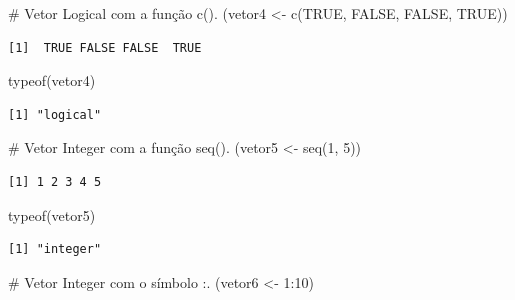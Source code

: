 \documentclass[
  letterpaper,
  DIV=11,
  numbers=noendperiod]{scrreprt}
\newenvironment{Shaded}{\begin{snugshade}}{\end{snugshade}}
\newcommand{\CommentTok}[1]{\textcolor[rgb]{0.37,0.37,0.37}{#1}}
\newcommand{\ConstantTok}[1]{\textcolor[rgb]{0.56,0.35,0.01}{#1}}
\newcommand{\DecValTok}[1]{\textcolor[rgb]{0.68,0.00,0.00}{#1}}
\newcommand{\FunctionTok}[1]{\textcolor[rgb]{0.28,0.35,0.67}{#1}}
\newcommand{\NormalTok}[1]{\textcolor[rgb]{0.00,0.23,0.31}{#1}}
\newcommand{\OtherTok}[1]{\textcolor[rgb]{0.00,0.23,0.31}{#1}}
\newcommand{\SpecialCharTok}[1]{\textcolor[rgb]{0.37,0.37,0.37}{#1}}
\begin{document}
\begin{Shaded}
\begin{Highlighting}[]
\CommentTok{\# Vetor Logical com a função c().}
\NormalTok{(vetor4 }\OtherTok{\textless{}{-}} \FunctionTok{c}\NormalTok{(}\ConstantTok{TRUE}\NormalTok{, }\ConstantTok{FALSE}\NormalTok{, }\ConstantTok{FALSE}\NormalTok{, }\ConstantTok{TRUE}\NormalTok{))}
\end{Highlighting}
\end{Shaded}

\begin{verbatim}
[1]  TRUE FALSE FALSE  TRUE
\end{verbatim}

\begin{Shaded}
\begin{Highlighting}[]
\FunctionTok{typeof}\NormalTok{(vetor4)}
\end{Highlighting}
\end{Shaded}

\begin{verbatim}
[1] "logical"
\end{verbatim}

\begin{Shaded}
\begin{Highlighting}[]
\CommentTok{\# Vetor Integer com a função seq().}
\NormalTok{(vetor5 }\OtherTok{\textless{}{-}} \FunctionTok{seq}\NormalTok{(}\DecValTok{1}\NormalTok{, }\DecValTok{5}\NormalTok{))}
\end{Highlighting}
\end{Shaded}

\begin{verbatim}
[1] 1 2 3 4 5
\end{verbatim}

\begin{Shaded}
\begin{Highlighting}[]
\FunctionTok{typeof}\NormalTok{(vetor5)}
\end{Highlighting}
\end{Shaded}

\begin{verbatim}
[1] "integer"
\end{verbatim}

\begin{Shaded}
\begin{Highlighting}[]
\CommentTok{\# Vetor Integer com o símbolo :.}
\NormalTok{(vetor6 }\OtherTok{\textless{}{-}} \DecValTok{1}\SpecialCharTok{:}\DecValTok{10}\NormalTok{)}
\end{Highlighting}
\end{Shaded}
\end{document}
